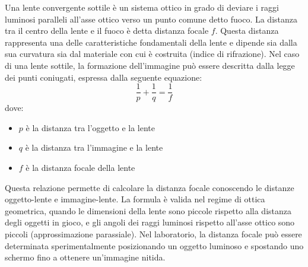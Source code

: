 Una lente convergente sottile è un sistema ottico in grado di deviare i raggi luminosi paralleli all'asse ottico verso un punto comune detto fuoco. 
La distanza tra il centro della lente e il fuoco è detta distanza focale $f$. Questa distanza rappresenta una delle caratteristiche fondamentali della lente e dipende 
sia dalla sua curvatura sia dal materiale con cui è costruita (indice di rifrazione). Nel caso di una lente sottile, la formazione dell'immagine può essere descritta dalla legge 
dei punti coniugati, espressa dalla seguente equazione:
\begin{equation}
    \frac{1}{p} + \frac{1}{q} = \frac{1}{f}
\end{equation}
dove:
\begin{itemize}
    \item $p$ è la distanza tra l'oggetto e la lente
    \item $q$ è la distanza tra l'immagine e la lente
    \item $f$ è la distanza focale della lente
\end{itemize}
Questa relazione permette di calcolare la distanza focale conoscendo le distanze oggetto-lente e immagine-lente. La formula è valida nel regime di ottica geometrica, 
quando le dimensioni della lente sono piccole rispetto alla distanza degli oggetti in gioco, e gli angoli dei raggi luminosi rispetto all'asse ottico sono piccoli 
(approssimazione parassiale). 
Nel laboratorio, la distanza focale può essere determinata sperimentalmente posizionando un oggetto luminoso e spostando uno schermo fino a ottenere un'immagine nitida.